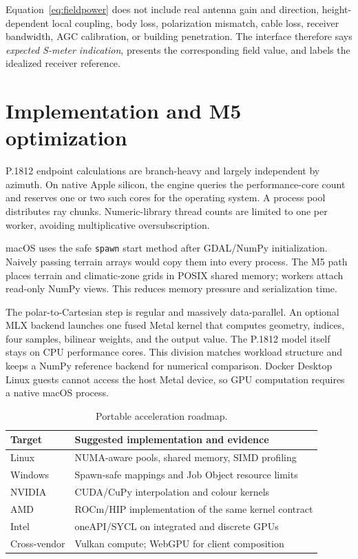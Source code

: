 \documentclass[10pt,a4paper,twocolumn]{article}
\begin{document}
Equation~\ref{eq:fieldpower} does not include real antenna gain and direction,
height-dependent local coupling, body loss, polarization mismatch, cable loss,
receiver bandwidth, AGC calibration, or building penetration. The interface
therefore says \emph{expected S-meter indication}, presents the corresponding
field value, and labels the idealized receiver reference.

\section{Implementation and M5 optimization}

P.1812 endpoint calculations are branch-heavy and largely independent by
azimuth. On native Apple silicon, the engine queries the performance-core count
and reserves one or two such cores for the operating system. A process pool
distributes ray chunks. Numeric-library thread counts are limited to one per
worker, avoiding multiplicative oversubscription.

macOS uses the safe \texttt{spawn} start method after GDAL/NumPy initialization.
Naively passing terrain arrays would copy them into every process. The M5 path
places terrain and climatic-zone grids in POSIX shared memory; workers attach
read-only NumPy views. This reduces memory pressure and serialization time.

The polar-to-Cartesian step is regular and massively data-parallel. An optional
MLX backend launches one fused Metal kernel that computes geometry, indices,
four samples, bilinear weights, and the output value. The P.1812 model itself
stays on CPU performance cores. This division matches workload structure and
keeps a NumPy reference backend for numerical comparison. Docker Desktop Linux
guests cannot access the host Metal device, so GPU computation requires a
native macOS process.

\begin{table}[t]
\centering
\caption{Portable acceleration roadmap.}
\label{tab:ports}
\begin{tabular}{p{}p{}}
\toprule
Target & Suggested implementation and evidence \\
\midrule
Linux & NUMA-aware pools, shared memory, SIMD profiling \\
Windows & Spawn-safe mappings and Job Object resource limits \\
NVIDIA & CUDA/CuPy interpolation and colour kernels \\
AMD & ROCm/HIP implementation of the same kernel contract \\
Intel & oneAPI/SYCL on integrated and discrete GPUs \\
Cross-vendor & Vulkan compute; WebGPU for client composition \\
\bottomrule
\end{tabular}
\end{table}
\end{document}
